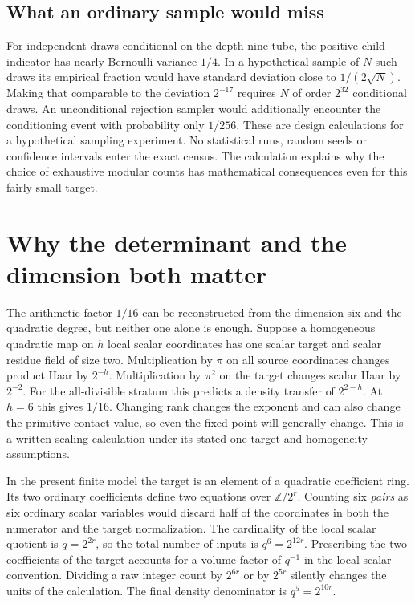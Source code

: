 \documentclass[12pt,letterpaper]{article}
\begin{document}
\subsection{What an ordinary sample would miss}
For independent draws conditional on the depth-nine tube, the positive-child indicator has nearly Bernoulli variance $1/4$. In a hypothetical sample of $N$ such draws its empirical fraction would have standard deviation close to $1/(2\sqrt N)$. Making that comparable to the deviation $2^{-17}$ requires $N$ of order $2^{32}$ conditional draws. An unconditional rejection sampler would additionally encounter the conditioning event with probability only $1/256$. These are design calculations for a hypothetical sampling experiment. No statistical runs, random seeds or confidence intervals enter the exact census. The calculation explains why the choice of exhaustive modular counts has mathematical consequences even for this fairly small target.

\section{Why the determinant and the dimension both matter}
The arithmetic factor $1/16$ can be reconstructed from the dimension six and the quadratic degree, but neither one alone is enough. Suppose a homogeneous quadratic map on $h$ local scalar coordinates has one scalar target and scalar residue field of size two. Multiplication by $\pi$ on all source coordinates changes product Haar by $2^{-h}$. Multiplication by $\pi^2$ on the target changes scalar Haar by $2^{-2}$. For the all-divisible stratum this predicts a density transfer of $2^{2-h}$. At $h=6$ this gives $1/16$. Changing rank changes the exponent and can also change the primitive contact value, so even the fixed point will generally change. This is a written scaling calculation under its stated one-target and homogeneity assumptions.

In the present finite model the target is an element of a quadratic coefficient ring. Its two ordinary coefficients define two equations over $\mathbb Z/2^r$. Counting six \emph{pairs} as six ordinary scalar variables would discard half of the coordinates in both the numerator and the target normalization. The cardinality of the local scalar quotient is $q=2^{2r}$, so the total number of inputs is $q^6=2^{12r}$. Prescribing the two coefficients of the target accounts for a volume factor of $q^{-1}$ in the local scalar convention. Dividing a raw integer count by $2^{6r}$ or by $2^{5r}$ silently changes the units of the calculation. The final density denominator is $q^5=2^{10r}$.
\end{document}

